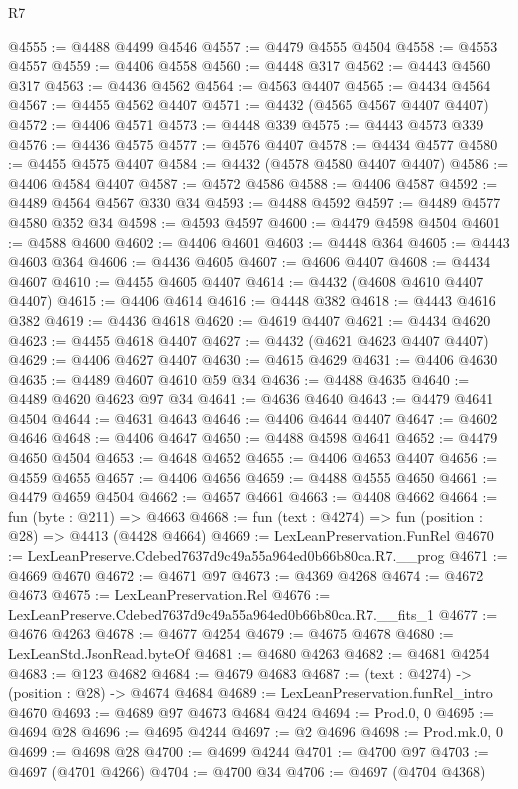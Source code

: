 \begin{lexlean}{R7}
\begin{coremodule}
@4555 := @4488 @4499 @4546
@4557 := @4479 @4555 @4504
@4558 := @4553 @4557
@4559 := @4406 @4558
@4560 := @4448 @317
@4562 := @4443 @4560 @317
@4563 := @4436 @4562
@4564 := @4563 @4407
@4565 := @4434 @4564
@4567 := @4455 @4562 @4407
@4571 := @4432 (@4565 @4567 @4407 @4407)
@4572 := @4406 @4571
@4573 := @4448 @339
@4575 := @4443 @4573 @339
@4576 := @4436 @4575
@4577 := @4576 @4407
@4578 := @4434 @4577
@4580 := @4455 @4575 @4407
@4584 := @4432 (@4578 @4580 @4407 @4407)
@4586 := @4406 @4584 @4407
@4587 := @4572 @4586
@4588 := @4406 @4587
@4592 := @4489 @4564 @4567 @330 @34
@4593 := @4488 @4592
@4597 := @4489 @4577 @4580 @352 @34
@4598 := @4593 @4597
@4600 := @4479 @4598 @4504
@4601 := @4588 @4600
@4602 := @4406 @4601
@4603 := @4448 @364
@4605 := @4443 @4603 @364
@4606 := @4436 @4605
@4607 := @4606 @4407
@4608 := @4434 @4607
@4610 := @4455 @4605 @4407
@4614 := @4432 (@4608 @4610 @4407 @4407)
@4615 := @4406 @4614
@4616 := @4448 @382
@4618 := @4443 @4616 @382
@4619 := @4436 @4618
@4620 := @4619 @4407
@4621 := @4434 @4620
@4623 := @4455 @4618 @4407
@4627 := @4432 (@4621 @4623 @4407 @4407)
@4629 := @4406 @4627 @4407
@4630 := @4615 @4629
@4631 := @4406 @4630
@4635 := @4489 @4607 @4610 @59 @34
@4636 := @4488 @4635
@4640 := @4489 @4620 @4623 @97 @34
@4641 := @4636 @4640
@4643 := @4479 @4641 @4504
@4644 := @4631 @4643
@4646 := @4406 @4644 @4407
@4647 := @4602 @4646
@4648 := @4406 @4647
@4650 := @4488 @4598 @4641
@4652 := @4479 @4650 @4504
@4653 := @4648 @4652
@4655 := @4406 @4653 @4407
@4656 := @4559 @4655
@4657 := @4406 @4656
@4659 := @4488 @4555 @4650
@4661 := @4479 @4659 @4504
@4662 := @4657 @4661
@4663 := @4408 @4662
@4664 := fun (byte : @211) => @4663
@4668 := fun (text : @4274) => fun (position : @28) => @4413 (@4428 @4664)
@4669 := LexLeanPreservation.FunRel
@4670 := LexLeanPreserve.Cdebed7637d9c49a55a964ed0b66b80ca.R7.__prog
@4671 := @4669 @4670
@4672 := @4671 @97
@4673 := @4369 @4268
@4674 := @4672 @4673
@4675 := LexLeanPreservation.Rel
@4676 := LexLeanPreserve.Cdebed7637d9c49a55a964ed0b66b80ca.R7.__fits_1
@4677 := @4676 @4263
@4678 := @4677 @4254
@4679 := @4675 @4678
@4680 := LexLeanStd.JsonRead.byteOf
@4681 := @4680 @4263
@4682 := @4681 @4254
@4683 := @123 @4682
@4684 := @4679 @4683
@4687 := (text : @4274) -> (position : @28) -> @4674 @4684
@4689 := LexLeanPreservation.funRel_intro @4670
@4693 := @4689 @97 @4673 @4684 @424
@4694 := Prod.{0, 0}
@4695 := @4694 @28
@4696 := @4695 @4244
@4697 := @2 @4696
@4698 := Prod.mk.{0, 0}
@4699 := @4698 @28
@4700 := @4699 @4244
@4701 := @4700 @97
@4703 := @4697 (@4701 @4266)
@4704 := @4700 @34
@4706 := @4697 (@4704 @4368)

\end{coremodule}
\end{lexlean}

